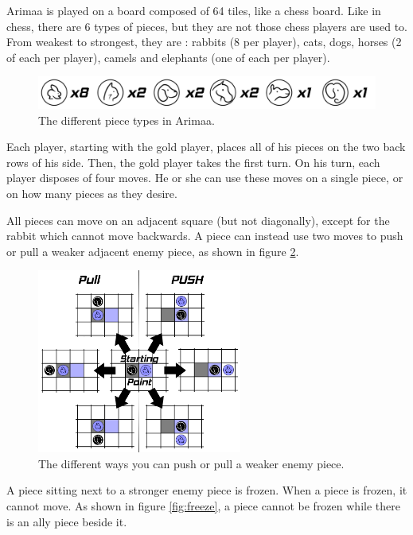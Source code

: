 Arimaa is played on a board composed of 64 tiles, like a chess board. Like in chess, there are 6 types of pieces, but they are not those chess players are used to. From weakest to strongest, they are : rabbits (8 per player), cats, dogs, horses (2 of each per player), camels and elephants (one of each per player).

\begin{figure}[!h]
\centering
\includegraphics[width=\textwidth]{1_Presentation/1.1_Arimaa_rules_Gabriel/Pictures/Pieces.png}
\caption{The different piece types in Arimaa.}
\label{fig:pieces}
\end{figure}

Each player, starting with the gold player, places all of his pieces on the two back rows of his side. Then, the gold player takes the first turn.
On his turn, each player disposes of four moves. He or she can use these moves on a single piece, or on how many pieces as they desire.

All pieces can move on an adjacent square (but not diagonally), except for the rabbit which cannot move backwards.
A piece can instead use two moves to push or pull a weaker adjacent enemy piece, as shown in figure \ref{fig:displace}.

\begin{figure}[!h]
\centering
\includegraphics[width=0.6\textwidth]{1_Presentation/1.1_Arimaa_rules_Gabriel/Pictures/Displace.png}
\caption{The different ways you can push or pull a weaker enemy piece.}
\label{fig:displace}
\end{figure}

A piece sitting next to a stronger enemy piece is frozen. When a piece is frozen, it cannot move. As shown in figure \ref{fig:freeze}, a piece cannot be frozen while there is an ally piece beside it.

